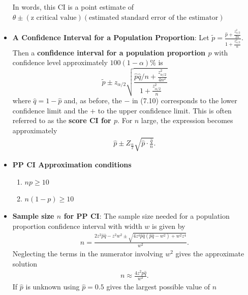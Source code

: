 \documentclass{report}
\begin{document}
\begin{itemize}
            \bigbreak \noindent 
            In words, this CI is a
            \bigbreak \noindent 
            point estimate of $\theta \pm (\text{z critical value})(\text{estimated standard error of the estimator})$
        \item \textbf{A Confidence Interval for a Population Proportion}:
            Let $\tilde{p} = \frac{\hat{p} + \frac{z_{\alpha/2}^2}{2n}}{1 + \frac{z_{\alpha/2}^2}{n}}$. Then a \textbf{confidence interval for a population proportion $p$} with confidence level approximately $100(1 - \alpha)\%$ is
            \[
                \tilde{p} \pm z_{\alpha/2} \sqrt{\frac{\hat{p} \hat{q} / n + \frac{z_{\alpha/2}^2}{4n^2}}{1 + \frac{z_{\alpha/2}^2}{n}}}
            \]
            where $\hat{q} = 1 - \hat{p}$ and, as before, the $-$ in (7.10) corresponds to the lower confidence limit and the $+$ to the upper confidence limit.
            \bigbreak \noindent  
            This is often referred to as the \textbf{score CI for $p$}.
            \bigbreak \noindent 
            For $n$ large, the expression becomes approximately
            \begin{align*}
                \hat{p} \pm Z_{\frac{\alpha}{2}} \sqrt{\hat{p} \cdot \frac{\hat{q}}{n}}
            .\end{align*}
        \item \textbf{PP CI Approximation conditions}
        \begin{enumerate}
            \item $np \geq 10$
            \item $n(1-p) \geq 10$
        \end{enumerate}
        \item \textbf{Sample size $n$ for PP CI}:
            The sample size needed for a population proportion confidence interval  with width $w$ is given by
            \bigbreak \noindent 
            \begin{align*}
                n = \frac{2z^{2}\hat{p}\hat{q} - z^{2}w^{2} \pm  \sqrt{4z^{4}\hat{p}\hat{q}(\hat{p}\hat{q}- w^{2}) + w^{2}z^{4}}}{w^{2}}
            .\end{align*}
            \bigbreak \noindent 
            Neglecting the terms in the numerator involving $w^{2}$ gives the approximate solution
            \begin{align*}
                n \approx  \frac{4z^{2}\hat{p}\hat{q}}{w^{2}}
            .\end{align*}
            If $\hat{p}$ is unknown using $\hat{p} = 0.5$ gives the largest possible value of $n$

\end{itemize}
\end{document}
